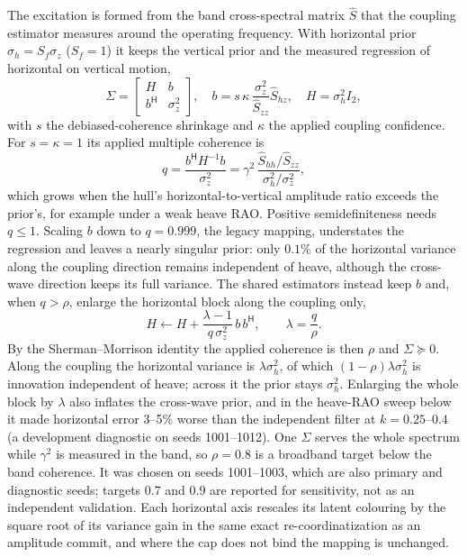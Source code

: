 \documentclass[conference]{IEEEtran}
\begin{document}
The excitation is formed from the band cross-spectral matrix $\hat S$ that the
coupling estimator measures around the operating frequency. With horizontal
prior $\sigma_h=S_f\sigma_z$ ($S_f=1$) it keeps the vertical prior and the
measured regression of horizontal on vertical motion,
\begin{equation}
 \Sigma=\begin{bmatrix}H&b\\b^{\mathsf H}&\sigma_z^2\end{bmatrix},\quad
 b=s\,\kappa\,\frac{\sigma_z^2}{\hat S_{zz}}\hat S_{hz},\quad H=\sigma_h^2I_2,
 \label{eq:excitation-map}
\end{equation}
with $s$ the debiased-coherence shrinkage and $\kappa$ the applied coupling
confidence. For $s=\kappa=1$ its applied multiple coherence is
\begin{equation}
 q=\frac{b^{\mathsf H}H^{-1}b}{\sigma_z^2}
  =\gamma^2\,\frac{\hat S_{hh}/\hat S_{zz}}{\sigma_h^2/\sigma_z^2},
\end{equation}
which grows when the hull's horizontal-to-vertical amplitude ratio exceeds the
prior's, for example under a weak heave RAO. Positive semidefiniteness needs
$q\le1$. Scaling $b$ down to $q=0.999$, the legacy mapping, understates the
regression and leaves a nearly singular prior: only $0.1\%$ of the
horizontal variance along the coupling direction remains independent of heave,
although the cross-wave direction keeps its full variance. The shared estimators instead keep $b$ and, when $q>\rho$,
enlarge the horizontal block along the coupling only,
\begin{equation}
 H\leftarrow H+\frac{\lambda-1}{q\,\sigma_z^2}\,b\,b^{\mathsf H},\qquad
 \lambda=\frac{q}{\rho}.
 \label{eq:cap-repair}
\end{equation}
By the Sherman--Morrison identity the applied coherence is then $\rho$ and
$\Sigma\succeq0$. Along the coupling the horizontal variance is
$\lambda\sigma_h^2$, of which $(1-\rho)\lambda\sigma_h^2$ is innovation
independent of heave; across it the prior stays $\sigma_h^2$. Enlarging the
whole block by $\lambda$ also inflates the cross-wave prior, and in the
heave-RAO sweep below it made horizontal error 3--5\% worse than the
independent filter at $k=0.25$--$0.4$ (a development diagnostic on seeds
1001--1012). One $\Sigma$ serves the whole spectrum while $\gamma^2$ is
measured in the band, so $\rho=0.8$ is a broadband target below the band
coherence. It was chosen on seeds 1001--1003, which are also primary and
diagnostic seeds; targets 0.7 and 0.9 are reported for sensitivity, not as an
independent validation. Each horizontal axis rescales its latent colouring by
the square root of its variance gain in the same exact re-coordinatization as
an amplitude commit, and where the cap does not bind the mapping is
unchanged.
\end{document}
